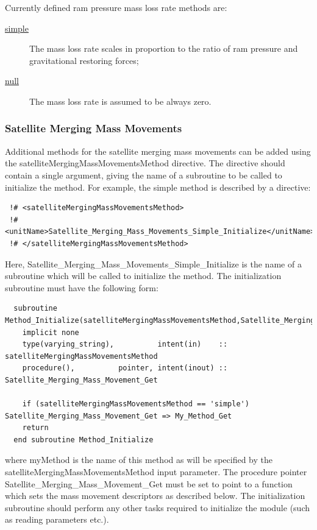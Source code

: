 Currently defined ram pressure mass loss rate methods are:
\begin{description}
 \item [\hyperlink{ram_pressure_stripping.mass_loss_rate.disks.simple.F90:ram_pressure_stripping_mass_loss_rate_disks_simple:ram_pressure_stripping_mass_loss_rate_disk_simple}{{\normalfont \ttfamily simple}}] The mass loss rate scales in proportion to the ratio of ram pressure and gravitational restoring forces;
 \item [\hyperlink{ram_pressure_stripping.mass_loss_rate.disks.null.F90:ram_pressure_stripping_mass_loss_rate_disks_null:ram_pressure_stripping_mass_loss_rate_disk_null}{{\normalfont \ttfamily null}}] The mass loss rate is assumed to be always zero.
\end{description}

\subsubsection{Satellite Merging Mass Movements}

Additional methods for the satellite merging mass movements can be added using the {\normalfont \ttfamily satelliteMergingMassMovementsMethod} directive. The directive should contain a single argument, giving the name of a subroutine to be called to initialize the method. For example, the {\normalfont \ttfamily simple} method is described by a directive:
\begin{verbatim}
 !# <satelliteMergingMassMovementsMethod>
 !#  <unitName>Satellite_Merging_Mass_Movements_Simple_Initialize</unitName>
 !# </satelliteMergingMassMovementsMethod>
\end{verbatim}
Here, {\normalfont \ttfamily Satellite\_Merging\_Mass\_Movements\_Simple\_Initialize} is the name of a subroutine which will be called to initialize the method. The initialization subroutine must have the following form:
\begin{verbatim}
  subroutine Method_Initialize(satelliteMergingMassMovementsMethod,Satellite_Merging_Mass_Movement_Get)
    implicit none
    type(varying_string),          intent(in)    :: satelliteMergingMassMovementsMethod
    procedure(),          pointer, intent(inout) :: Satellite_Merging_Mass_Movement_Get
    
    if (satelliteMergingMassMovementsMethod == 'simple') Satellite_Merging_Mass_Movement_Get => My_Method_Get
    return
  end subroutine Method_Initialize
\end{verbatim}
where {\normalfont \ttfamily myMethod} is the name of this method as will be specified by the {\normalfont \ttfamily satelliteMergingMassMovementsMethod} input parameter. The procedure pointer {\normalfont \ttfamily Satellite\_Merging\_Mass\_Movement\_Get} must be set to point to a function which sets the mass movement descriptors as described below. The initialization subroutine should perform any other tasks required to initialize the module (such as reading parameters etc.).

